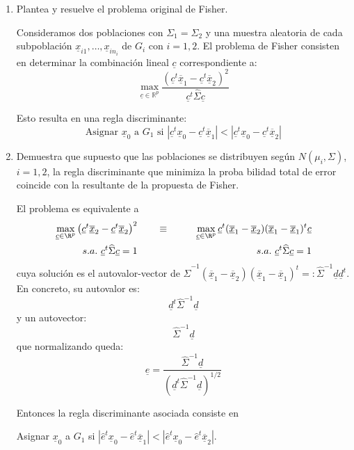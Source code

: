 \documentclass[twoside]{article}
\newcommand{\muestra}[1]{{\underline{#1}}}
\newcommand{\m}[1]{{\muestra{#1}}}
\begin{document}
\begin{enumerate}
\begin{enumerate}
	\item Plantea y resuelve el problema original de Fisher. 

	\begin{sol}
	Consideramos dos poblaciones con $\Sigma_1 = \Sigma_2$ y una muestra aleatoria de cada subpoblación $\m{x}_{i1},\dots,\m{x}_{in_i}$ de $G_i$ con $i=1,2$.
	El problema de Fisher consisten en determinar la combinación lineal $\m{c}$ correspondiente a:
	\[ \max_{\m{c} \in \mathbb{R}^p} \frac{\left(\m{c}^t \m{\overline{x}}_1-\m{c}^t \m{\overline{x}}_2\right)^2}{\m{c}^t \widehat{\Sigma} \m{c}} \]
	
	Esto resulta en una regla discriminante:
	\[ \text{Asignar }\m{x}_0\text{ a }G_1\text{ si }|\m{c}^t \m{x}_0 - \m{c}^t\m{\overline{x}}_1 | < |\m{c}^t\m{x}_0 - \m{c}^t\m{\overline{x}}_2| \]
	\end{sol}

	\item Demuestra que supuesto que las poblaciones se distribuyen según $N(\mu_i, \Sigma)$, $i = 1, 2$, la regla discriminante que minimiza la proba bilidad total de error coincide con la resultante de la propuesta de Fisher.

	\begin{sol}
	El problema es equivalente a  
	\begin{align*}
	\max_{\m{c} \in \R^p} \left(\m{c}^t\m{\overline{x}}_2-\m{c}^t\m{\overline{x}}_2\right)^2 & \qquad \equiv \qquad & \max_{\m{c} \in \R^p} \m{c}^t(\m{\overline{x}}_1-\m{\overline{x}}_2)(\m{\overline{x}}_1-\m{\overline{x}}_1)^t \m{c} \\
	s.a.\ \m{c}^t \widehat{\Sigma} \m{c} = 1 & & s.a.\ \m{c}^t \widehat{\Sigma} \m{c} = 1
	\end{align*}
	cuya solución es el autovalor-vector de $\widehat{\Sigma}^{-1} (\m{\overline{x}}_1-\m{\overline{x}}_2)(\m{\overline{x}}_1-\m{\overline{x}}_1)^t =: \widehat{\Sigma}^{-1}\m{d}\m{d}^t$. En concreto, su autovalor es:
	\[ \m{d}^t \widehat{\Sigma}^{-1} \m{d} \]
	y un autovector:
	\[ \widehat{\Sigma}^{-1}\m{d} \]
	que normalizando queda:
	\[ \m{e} = \frac{\widehat{\Sigma}^{-1}\m{d}}{\left(\m{d}^t \widehat{\Sigma}^{-1}\m{d}\right)^{1/2}}\]

	Entonces la regla discriminante asociada consiste en 
	\begin{center}Asignar $\m{x}_0$ a $G_1$ si $|\widehat{e}^t \m{x}_0 - \widehat{e}^t \m{\overline{x}}_1| < |\widehat{e}^t \m{x}_0 - \widehat{e}^t \m{\overline{x}}_2|$.\end{center}


\end{sol}
\end{enumerate}
\end{enumerate}
\end{document}
